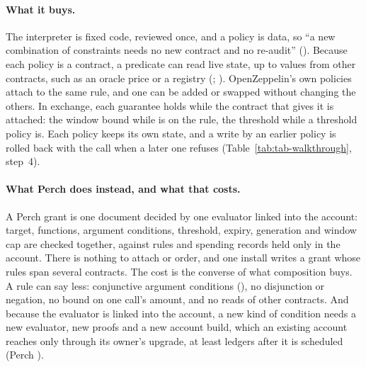 \paragraph{What it buys.} The interpreter is fixed code, reviewed once, and a
policy is data, so ``a new combination of constraints needs no new contract and
no re-audit'' (). Because each policy is a contract, a
predicate can read live state, up to  values from
other contracts, such as an oracle price or a registry
(; ). OpenZeppelin's own policies
attach to the same rule, and one can be added or swapped without changing the
others. In
exchange, each guarantee holds while the contract that gives it is attached: the
window bound while  is on the rule, the threshold while a
threshold policy is. Each policy keeps its own state, and a write by an earlier
policy is rolled back with the call when a later one refuses
(Table~\ref{tab:tab-walkthrough}, step~4).

\paragraph{What Perch does instead, and what that costs.} A Perch grant is one
document decided by one evaluator linked into the account: target, functions,
argument conditions, threshold, expiry, generation and window cap are checked
together, against rules and spending records held only in the account. There is
nothing to attach or order, and one install writes a grant whose rules span
several contracts. The cost is the converse of what composition buys. A rule can
say less:  conjunctive argument conditions
(), no disjunction or negation, no bound on one call's
amount, and no reads of other contracts. And because the evaluator is linked into
the account, a new kind of condition needs a new evaluator, new proofs and a new
account build, which an existing account reaches only through its owner's
upgrade, at least  ledgers after it is scheduled
(Perch ).
